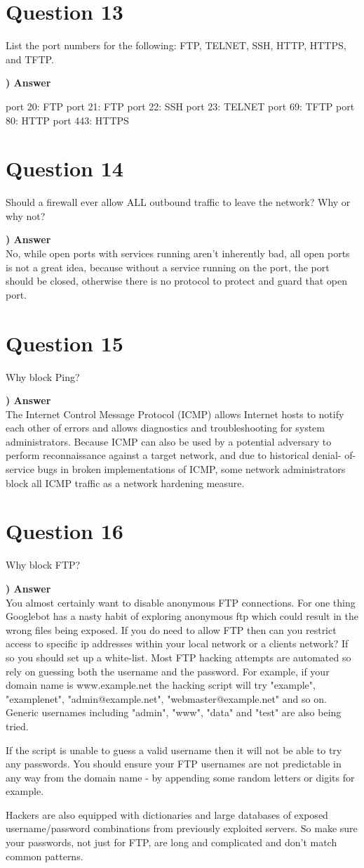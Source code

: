\documentclass{report}
\newcommand{\mysection}[1]{\section*{#1}}
\newcommand{\mysubsection}[2]{\textbf{\romannumeral #1) #2}}
\begin{document}
\mysection{\textbf{Question 13}}
List the port numbers for the following:  FTP, TELNET, SSH, HTTP, HTTPS, and TFTP.

\noindent\mysubsection{13}{Answer}


\begin{outline}
	\centering
	\1 port 20: FTP
	\1 port 21: FTP
	\1 port 22: SSH
	\1 port 23: TELNET
	\1 port 69: TFTP
	\1 port 80: HTTP
	\1 port 443: HTTPS
\end{outline}


\mysection{\textbf{Question 14}}
Should a firewall ever allow ALL outbound traffic to leave the network?  Why or why not?  

\noindent\mysubsection{14}{Answer}
\\No, while open ports with services running aren't inherently bad, all open ports is
not a great idea, because without a service running on the port, the port should be
closed, otherwise there is no protocol to protect and guard that open port.

\mysection{\textbf{Question 15}}
Why block Ping?

\noindent\mysubsection{15}{Answer}
\\The Internet Control Message Protocol (ICMP) allows Internet hosts to notify 
each other of errors and allows diagnostics and troubleshooting for system 
administrators. Because ICMP can also be used by a potential adversary to 
perform reconnaissance against a target network, and due to historical denial-
of-service bugs in broken implementations of ICMP, some network administrators 
block all ICMP traffic as a network hardening measure.


\mysection{\textbf{Question 16}}
Why block FTP?

\noindent\mysubsection{16}{Answer}
\\You almost certainly want to disable anonymous FTP connections. 
For one thing Googlebot has a nasty habit of exploring anonymous 
ftp which could result in the wrong files being exposed. 
If you do need to allow FTP then can you restrict access to 
specific ip addresses within your local network or a clients network? 
If so you should set up a white-list. Most FTP hacking attempts are 
automated so rely on guessing both the username and the password. 
For example, if your domain name is www.example.net the hacking 
script will try "example", "examplenet", "admin@example.net", 
"webmaster@example.net" and so on. Generic usernames including 
"admin", "www", "data" and "test" are also being tried.


If the script is unable to guess a valid username then it will not be able to 
try any passwords. You should ensure your FTP usernames are not 
predictable in any way from the domain name - by appending 
some random letters or digits for example.


Hackers are also equipped with dictionaries and large databases of exposed 
username/password combinations from previously exploited servers.
So make sure your passwords, not just for FTP, are long and 
complicated and don't match common patterns.


\end{document}

